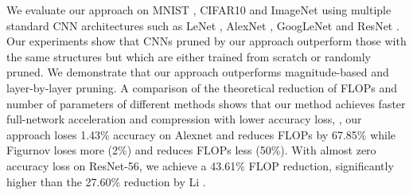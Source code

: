 \documentclass[10pt,twocolumn,letterpaper]{article}
\begin{document}
We evaluate our approach on MNIST \cite{lenet}, CIFAR10 \cite{CIFAR10} and ImageNet \cite{imagenet_cvpr09} using multiple standard CNN architectures such as LeNet \cite{lenet}, AlexNet \cite{Alexnet}, GoogLeNet \cite{googlenet} and ResNet \cite{resnet}. 
Our experiments show that CNNs pruned by our approach outperform those with the same structures but which are either trained from scratch or randomly pruned. We demonstrate that our approach outperforms magnitude-based and layer-by-layer pruning. 
A comparison of the theoretical reduction of FLOPs and number of parameters of different methods shows that our method achieves faster full-network acceleration and compression with lower accuracy loss, \eg, our approach loses 1.43\% accuracy on Alexnet and reduces FLOPs by 67.85\% while Figurnov \etal\cite{PerforatedCNN} loses more (2\%) and reduces FLOPs less (50\%).  With almost zero accuracy loss on ResNet-56, we achieve a 43.61\% FLOP reduction, significantly higher than the 27.60\% reduction by Li \etal\cite{pruneweigth}.

\end{document}
